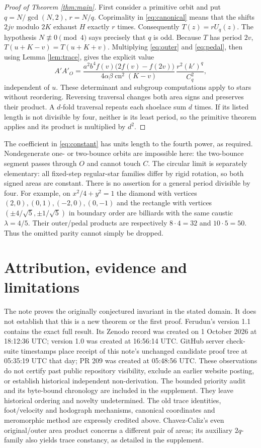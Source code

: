 \documentclass[11pt]{article}
\newcommand{\cn}{\operatorname{cn}}
\begin{document}
\begin{proof}[Proof of Theorem \ref{thm:main}]
First consider a primitive orbit and put
$q=N/\gcd(N,2)$, $r=N/q$. Coprimality in \eqref{eq:canonical} means that
the shifts $2jv$ modulo $2K$ exhaust $H$ exactly $r$ times. Consequently
$T(z)=rU_q(z)$. The hypothesis $N\not\equiv0\pmod4$ says precisely that
$q$ is odd. Because $T$ has period $2v$,
$T(u+K-v)=T(u+K+v)$. Multiplying \eqref{eq:outer} and
\eqref{eq:pedal}, then using Lemma \ref{lem:trace}, gives the explicit value
\begin{equation}\label{eq:constant}
 A'A'_O=
 \frac{a^2b^4 f(v)\bigl(2f(v)-f(2v)\bigr)}
 {4\alpha\beta\cn^2(K-v)}\,
 \frac{r^2(k')^q}{C_q^2},
\end{equation}
independent of $u$. These determinant and subgroup computations apply to
stars without reordering. Reversing traversal changes both area signs and
preserves their product. A $d$-fold traversal repeats each shoelace sum $d$
times. If its listed length is not divisible by four, neither is its least
period, so the primitive theorem applies and its product is multiplied by
$d^2$.
\end{proof}

The coefficient in \eqref{eq:constant} has units length to the fourth
power, as required. Nondegenerate one- or two-bounce orbits are impossible
here: the two-bounce segment passes through $O$ and cannot touch $C$.
The circular limit is separately elementary: all fixed-step regular-star
families differ by rigid rotation, so both signed areas are constant.
There is no assertion for a general period divisible by four. For example,
on $x^2/4+y^2=1$ the diamond with vertices $(2,0),(0,1),(-2,0),(0,-1)$
and the rectangle with vertices $(\pm4/\sqrt5,\pm1/\sqrt5)$ in boundary
order are billiards with the same caustic $\lambda=4/5$.
Their outer/pedal products are respectively $8\cdot4=32$ and
$10\cdot5=50$. Thus the omitted parity cannot simply be dropped.

\section{Attribution, evidence and limitations}
The note proves the originally conjectured invariant in the stated domain.
It does not establish that this is a new theorem or the first proof.
Ferudun's version 1.1 \cite{Ferudun} contains the exact full result.
Its Zenodo record was created on 1 October 2026 at 18:12:36 UTC; version 1.0
was created at 16:56:14 UTC. GitHub server check-suite timestamps place
receipt of this note's unchanged candidate proof tree at 05:35:19 UTC that
day; PR 209 was created at 05:48:56 UTC. These observations do not certify
past public repository visibility, exclude an earlier website posting, or
establish historical independent non-derivation. The bounded priority audit
and its byte-bound chronology are included in the supplement. They leave
historical ordering and novelty undetermined. The old trace identities,
foot/velocity and hodograph mechanisms, canonical coordinates and
meromorphic method are expressly credited above. Chavez-Caliz's even
original/outer area product \cite[Theorem 6]{CC} concerns a different pair
of areas; its auxiliary $2q$-family also yields trace constancy, as detailed
in the supplement.
\end{document}
